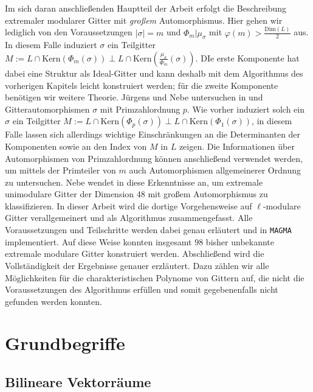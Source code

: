 \documentclass[12pt,a4paper,halfparskip,headsepline,bibtotocnumbered]{scrreprt}
\theoremstyle{nummermitklammern}
\theoremstyle{nonumberbreak}
\newcommand{\Kern}{\text{Kern}}
\begin{document}
Im sich daran anschließenden Hauptteil der Arbeit erfolgt die Beschreibung extremaler modularer Gitter mit \textit{großem} Automorphismus. Hier gehen wir lediglich von den Voraussetzungen $\vert \sigma \vert = m$ und $\Phi_m \vert \mu_\sigma$ mit $\varphi(m) > \frac{\text{Dim}(L)}{2}$ aus. In diesem Falle induziert $\sigma$ ein Teilgitter $M := L \cap \Kern(\Phi_m(\sigma)) \perp L \cap \Kern(\frac{\mu_\sigma}{\Phi_m}(\sigma))$. DIe erste Komponente hat dabei eine Struktur als Ideal-Gitter und kann deshalb mit dem Algorithmus des vorherigen Kapitels leicht konstruiert werden; für die zweite Komponente benötigen wir weitere Theorie. Jürgens und Nebe untersuchen in \cite{juergens} und \cite{nebe} Gitterautomorphismen $\sigma$ mit Primzahlordnung $p$. Wie vorher induziert solch ein $\sigma$ ein Teilgitter $M := L \cap \Kern(\Phi_p(\sigma)) \perp L \cap \Kern(\Phi_1(\sigma))$, in diesem Falle lassen sich allerdings wichtige Einschränkungen an die Determinanten der Komponenten sowie an den Index von $M$ in $L$ zeigen. Die Informationen über Automorphismen von Primzahlordnung können anschließend verwendet werden, um mittels der Primteiler von $m$ auch Automorphismen allgemeinerer Ordnung zu untersuchen. Nebe wendet in \cite{nebe} diese Erkenntnisse an, um extremale unimodulare Gitter der Dimension $48$ mit großem Automorphismus zu klassifizieren. In dieser Arbeit wird die dortige Vorgehensweise auf $\ell$-modulare Gitter verallgemeinert und als Algorithmus zusammengefasst. Alle Voraussetzungen und Teilschritte werden dabei genau erläutert und in \texttt{MAGMA} implementiert. Auf diese Weise konnten insgesamt $98$ bisher unbekannte extremale modulare Gitter konstruiert werden. Abschließend wird die Vollständigkeit der Ergebnisse genauer erzläutert. Dazu zählen wir alle Möglichkeiten für die charakteristischen Polynome von Gittern auf, die nicht die Voraussetzungen des Algorithmus erfüllen und somit gegebenenfalls nicht gefunden werden konnten.



\chapter{Grundbegriffe}

\section{Bilineare Vektorräume}
\end{document}
